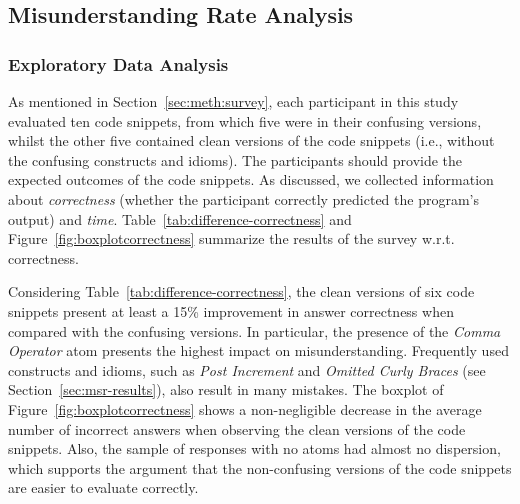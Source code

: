   


\subsection{Misunderstanding Rate Analysis}

\subsubsection*{Exploratory Data Analysis}

As mentioned in Section~\ref{sec:meth:survey}, each participant in this study evaluated ten
code snippets, from which five were in their confusing versions, whilst the other five contained clean versions of the code snippets (i.e., without the confusing constructs and idioms). The participants should provide the expected outcomes of the code snippets. As discussed, we collected information about \emph{correctness} (whether the participant correctly predicted the program's output) and \emph{time}. 
Table~\ref{tab:difference-correctness} and Figure~\ref{fig:boxplotcorrectness} summarize the results of the survey w.r.t. correctness.

Considering Table~\ref{tab:difference-correctness}, the clean versions of six code snippets present at least a 15\% improvement in answer correctness when compared with the confusing versions. In particular, the presence of the \emph{Comma Operator} atom presents the highest impact on misunderstanding. 
Frequently used constructs and idioms, such as \emph{Post Increment} and \emph{Omitted Curly Braces} (see Section~\ref{sec:msr-results}), also result in many mistakes. %
The boxplot of Figure~\ref{fig:boxplotcorrectness} shows a non-negligible decrease in the average number of incorrect answers when observing the clean versions of the code snippets. Also, the sample of responses with no atoms had almost no dispersion, which supports the
argument that the non-confusing versions of the code snippets are easier to evaluate correctly. 



